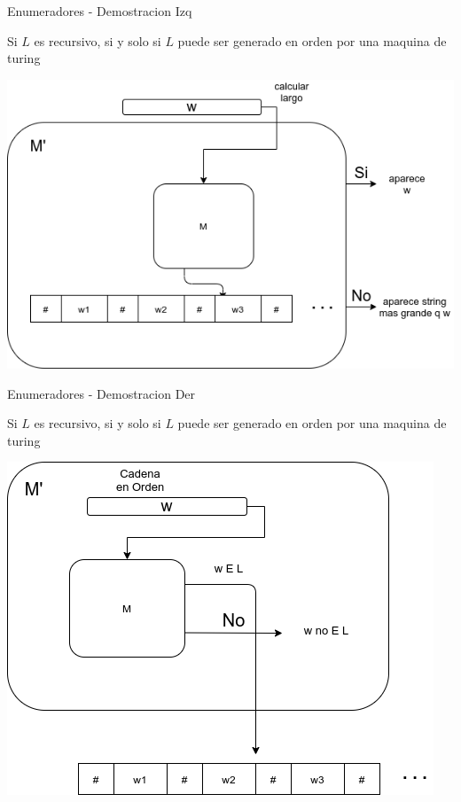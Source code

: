 \documentclass[11pt]{beamer}
\begin{document}
		\begin{frame}{Enumeradores - Demostracion Izq}
			\justifying
	        \begin{theorem}
                Si $L$ es recursivo, si y solo si  $L$ puede ser generado en orden por una maquina de turing
            \end{theorem}
            \begin{center}
            \includegraphics[scale=0.4]{img/teo_2.png}
			\end{center}
		\end{frame}
		
		\begin{frame}{Enumeradores - Demostracion Der}
			\justifying
	        \begin{theorem}
                Si $L$ es recursivo, si y solo si  $L$ puede ser generado en orden por una maquina de turing
            \end{theorem}
            \begin{center}
            \includegraphics[scale=0.4]{img/teo2_b.png}
			\end{center}
		\end{frame}
	
\end{document}
